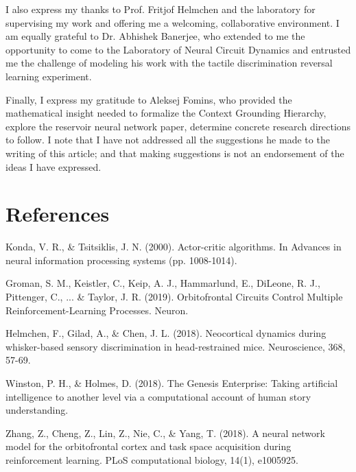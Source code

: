 \documentclass[11pt]{article}
\begin{document}
I also express my thanks to Prof. Fritjof Helmchen and the laboratory for supervising my work and offering me a welcoming, collaborative environment.  I am equally grateful to Dr. Abhishek Banerjee, who extended to me the opportunity to come to the Laboratory of Neural Circuit Dynamics and entrusted me the challenge of modeling his work with the tactile discrimination reversal learning experiment.

Finally, I express my gratitude to Aleksej Fomins, who provided the mathematical insight needed to formalize the Context Grounding Hierarchy, explore the reservoir neural network paper, determine concrete research directions to follow.  I note that I have not addressed all the suggestions he made to the writing of this article; and that making suggestions is not an endorsement of the ideas I have expressed.

\newpage
\section{References}

Konda, V. R., \& Tsitsiklis, J. N. (2000). Actor-critic algorithms. In Advances in neural information processing systems (pp. 1008-1014).

Groman, S. M., Keistler, C., Keip, A. J., Hammarlund, E., DiLeone, R. J., Pittenger, C., ... \& Taylor, J. R. (2019). Orbitofrontal Circuits Control Multiple Reinforcement-Learning Processes. Neuron.

Helmchen, F., Gilad, A., \& Chen, J. L. (2018). Neocortical dynamics during whisker-based sensory discrimination in head-restrained mice. Neuroscience, 368, 57-69.

Winston, P. H., \& Holmes, D. (2018). The Genesis Enterprise: Taking artificial intelligence to another level via a computational account of human story understanding.

Zhang, Z., Cheng, Z., Lin, Z., Nie, C., \& Yang, T. (2018). A neural network model for the orbitofrontal cortex and task space acquisition during reinforcement learning. PLoS computational biology, 14(1), e1005925.

\newpage



\end{document}

